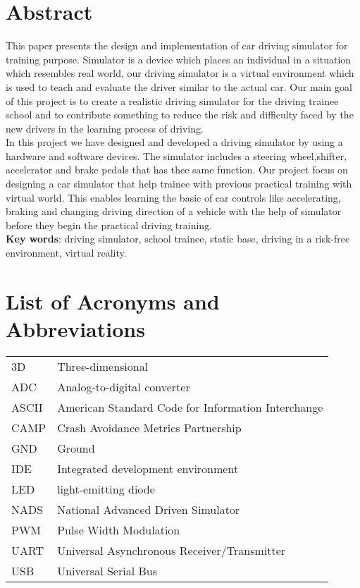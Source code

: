 \documentclass[12pt,a4paper]{article}
\begin{document}
\section*{Abstract}
This paper presents the design  and implementation of car driving simulator for training purpose. Simulator is a device which places an individual in a situation which resembles real world, our driving simulator is a virtual environment which is used to teach and evaluate the driver similar to the actual car. Our main goal of this project is to create a realistic driving simulator for the driving trainee school and to contribute something to reduce the risk and difficulty faced by the new drivers in the learning process of driving.\\

In this project we have designed and developed a driving simulator by using a hardware and software devices. The simulator includes a steering wheel,shifter, accelerator and brake pedals that has thee same function. Our project focus on designing a car simulator that help trainee with previous practical training with virtual world. This enables learning the basic of car controls like accelerating, braking and changing driving direction of a vehicle with the help of simulator before they begin the practical driving training.\\

\textbf{Key words}: driving simulator, school trainee, static base, driving in a risk-free environment, virtual reality.
\newpage

\tableofcontents
\newpage
\listoffigures
\newpage
\listoftables
\newpage
\section*{List of Acronyms and Abbreviations}
\begin{tabular}{l l}
	3D & Three-dimensional \\
	ADC  & Analog-to-digital converter\\
	ASCII   & American Standard Code for Information Interchange\\
	CAMP & Crash Avoidance Metrics Partnership\\
	GND & Ground\\
	IDE & Integrated development environment\\
	LED  &light-emitting diode \\
	NADS & National Advanced Driven Simulator\\
	PWM  & Pulse Width Modulation \\
	UART & Universal Asynchronous Receiver/Transmitter \\
	USB  & Universal Serial Bus\\
	

\end{tabular}
\pagebreak
\end{document}
